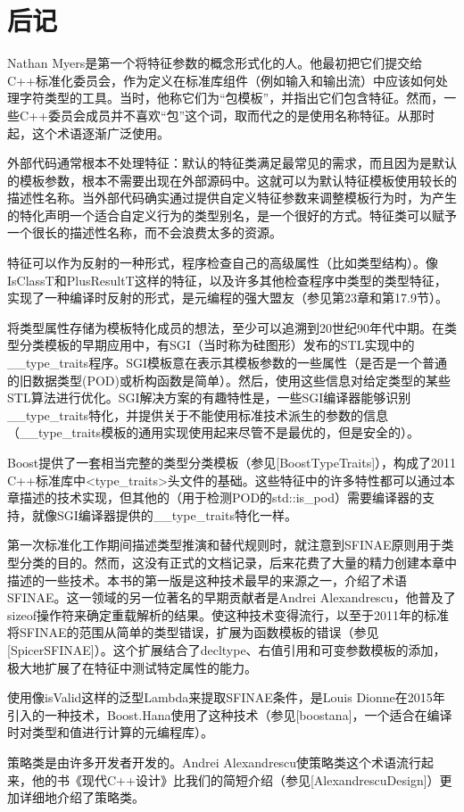 \section{后记}
Nathan Myers是第一个将特征参数的概念形式化的人。他最初把它们提交给C++标准化委员会，作为定义在标准库组件（例如输入和输出流）中应该如何处理字符类型的工具。当时，他称它们为“包模板”，并指出它们包含特征。然而，一些C++委员会成员并不喜欢“包”这个词，取而代之的是使用名称特征。从那时起，这个术语逐渐广泛使用。

外部代码通常根本不处理特征：默认的特征类满足最常见的需求，而且因为是默认的模板参数，根本不需要出现在外部源码中。这就可以为默认特征模板使用较长的描述性名称。当外部代码确实通过提供自定义特征参数来调整模板行为时，为产生的特化声明一个适合自定义行为的类型别名，是一个很好的方式。特征类可以赋予一个很长的描述性名称，而不会浪费太多的资源。

特征可以作为反射的一种形式，程序检查自己的高级属性（比如类型结构）。像IsClassT和PlusResultT这样的特征，以及许多其他检查程序中类型的类型特征，实现了一种编译时反射的形式，是元编程的强大盟友（参见第23章和第17.9节）。

将类型属性存储为模板特化成员的想法，至少可以追溯到20世纪90年代中期。在类型分类模板的早期应用中，有SGI（当时称为硅图形）发布的STL实现中的\_\_type\_traits程序。SGI模板意在表示其模板参数的一些属性（是否是一个普通的旧数据类型(POD)或析构函数是简单）。然后，使用这些信息对给定类型的某些STL算法进行优化。SGI解决方案的有趣特性是，一些SGI编译器能够识别\_\_type\_traits特化，并提供关于不能使用标准技术派生的参数的信息（\_\_type\_traits模板的通用实现使用起来尽管不是最优的，但是安全的）。

Boost提供了一套相当完整的类型分类模板（参见[BoostTypeTraits]），构成了2011 C++标准库中<type\_traits>头文件的基础。这些特征中的许多特性都可以通过本章描述的技术实现，但其他的（用于检测POD的std::is\_pod）需要编译器的支持，就像SGI编译器提供的\_\_type\_traits特化一样。

第一次标准化工作期间描述类型推演和替代规则时，就注意到SFINAE原则用于类型分类的目的。然而，这没有正式的文档记录，后来花费了大量的精力创建本章中描述的一些技术。本书的第一版是这种技术最早的来源之一，介绍了术语SFINAE。这一领域的另一位著名的早期贡献者是Andrei Alexandrescu，他普及了sizeof操作符来确定重载解析的结果。使这种技术变得流行，以至于2011年的标准将SFINAE的范围从简单的类型错误，扩展为函数模板的错误（参见[SpicerSFINAE]）。这个扩展结合了decltype、右值引用和可变参数模板的添加，极大地扩展了在特征中测试特定属性的能力。

使用像isValid这样的泛型Lambda来提取SFINAE条件，是Louis Dionne在2015年引入的一种技术，Boost.Hana使用了这种技术（参见[boostana]，一个适合在编译时对类型和值进行计算的元编程库）。

策略类是由许多开发者开发的。Andrei Alexandrescu使策略类这个术语流行起来，他的书《现代C++设计》比我们的简短介绍（参见[AlexandrescuDesign]）更加详细地介绍了策略类。